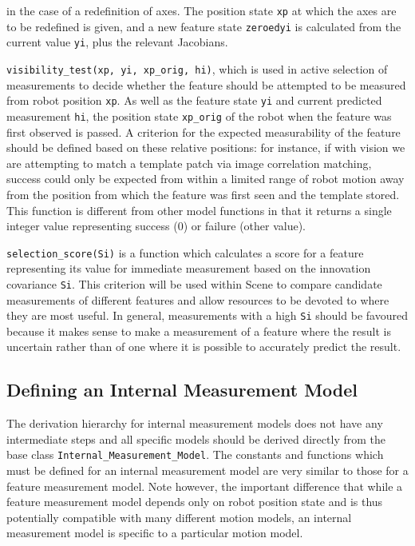 \documentclass{article}
\begin{document}
in the case of a redefinition of axes. The position state {\tt xp} at
which the axes are to be redefined is given, and a new feature state
{\tt zeroedyi} is calculated from the current value {\tt yi}, plus the
relevant Jacobians.
\item {\tt visibility\_test(xp, yi, xp\_orig, hi)}, which is used in
active selection of measurements to decide whether the feature should
be attempted to be measured from robot position {\tt xp}. As well as
the feature state {\tt yi} and current predicted measurement {\tt hi},
the position state {\tt xp\_orig} of the robot when the
feature was first observed is passed. A criterion for the
expected measurability of the feature should be defined based on these
relative positions: for instance, if with vision we are attempting to match a
template patch via image correlation matching, success could only be expected from
within a limited range of robot motion away from the position from
which the feature was first seen and the template stored.
This function is different from other model functions in that it
returns a single integer value representing success (0) or failure
(other value).
\item {\tt selection\_score(Si)} is a function which calculates a
score for a feature representing its value for immediate measurement
based on the innovation covariance {\tt Si}. This criterion will be
used within Scene to compare candidate measurements of
different features and allow resources to be devoted to where they are
most useful. In general, measurements with a high {\tt Si} should be
favoured because it makes sense to  make a measurement of a feature where
the result is uncertain rather than of one where it is possible to
accurately predict the result.

\ee

\subsection{Defining an Internal Measurement Model}

The derivation hierarchy for internal measurement models does not have
any intermediate steps and all specific models should be derived
directly from the base class {\tt Internal\_Measurement\_Model}. 
The constants and functions which must be defined for an internal
measurement model are very similar to those for a feature measurement
model. Note however, the important difference that while a feature
measurement model depends only on robot position state and is thus
potentially compatible with many different motion models, an internal
measurement model is specific to a particular motion model.
\end{document}
